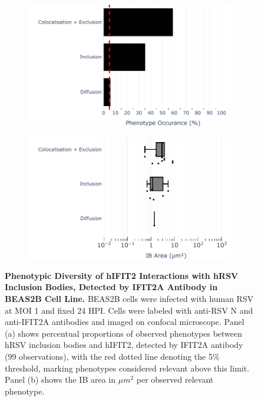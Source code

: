 \begin{figure}
    \begin{subfigure}{0.495\textwidth}
        \caption{}
        \includegraphics[width=1\linewidth]{08. Chapter 3/Figs/02. Infection/02. IFIT2/01. IFIT2A/10. bar_i2a_beas2b.pdf} 
    \end{subfigure}
    \begin{subfigure}{0.495\textwidth}
        \caption{}
        \includegraphics[width=1\linewidth]{08. Chapter 3/Figs/02. Infection/02. IFIT2/01. IFIT2A/11. box_i2a_beas2b.pdf}
    \end{subfigure}
    \caption[Phenotypic Diversity of hIFIT2 Interactions with hRSV Inclusion Bodies, Detected by IFIT2A Antibody in BEAS2B Cell Line.]{\textbf{Phenotypic Diversity of hIFIT2 Interactions with hRSV Inclusion Bodies, Detected by IFIT2A Antibody in BEAS2B Cell Line.} BEAS2B cells were infected with human RSV at MOI 1 and fixed 24 HPI. Cells were labeled with anti-RSV N and anti-IFIT2A antibodies and imaged on confocal microscope. Panel (a) shows percentual proportions of observed phenotypes between hRSV inclusion bodies and hIFIT2, detected by IFIT2A antibody (99 observations), with the red dotted line denoting the 5\% threshold, marking phenotypes considered relevant above this limit. Panel (b) shows the IB area in \(\mu m^2\) per observed relevant phenotype.}
    \label{fig:Phenotypic Diversity of hIFIT2 Interactions with hRSV Inclusion Bodies, Detected by IFIT2A Antibody in BEAS2B Cell Line}
\end{figure}

